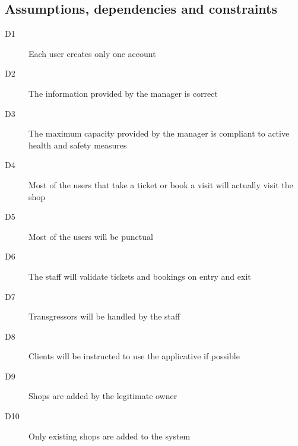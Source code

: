 \subsection{Assumptions, dependencies and constraints}
\begin{description}
    \item[D1] Each user creates only one account
    \item[D2] The information provided by the manager is correct
    \item[D3] The maximum capacity provided by the manager is compliant to active health and safety measures 
    \item[D4] Most of the users that take a ticket or book a visit will actually visit the shop
    \item[D5] Most of the users will be punctual
    \item[D6] The staff will validate tickets and bookings on entry and exit
    \item[D7] Transgressors will be handled by the staff
    \item[D8] Clients will be instructed to use the applicative if possible
    \item[D9] Shops are added by the legitimate owner
    \item[D10] Only existing shops are added to the system
\end{description}